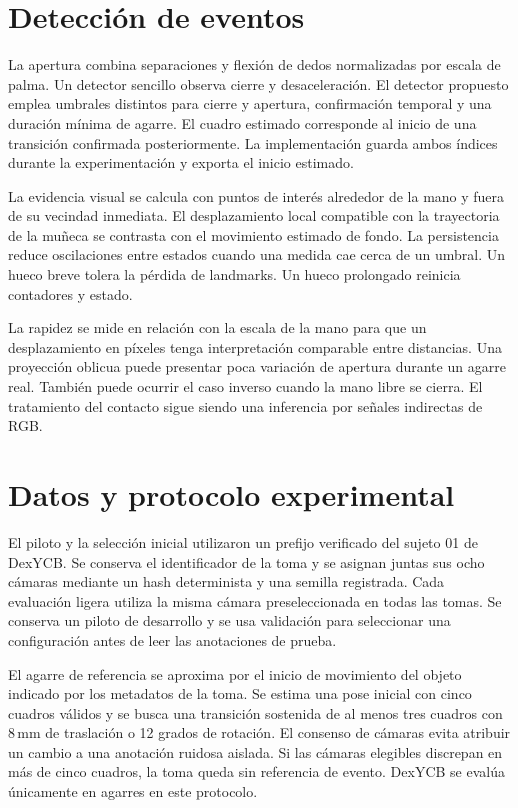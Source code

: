 \documentclass[conference]{IEEEtran}
\begin{document}
\section{Detección de eventos}
La apertura combina separaciones y flexión de dedos normalizadas por escala de palma. Un detector sencillo observa cierre y desaceleración. El detector propuesto emplea umbrales distintos para cierre y apertura, confirmación temporal y una duración mínima de agarre. El cuadro estimado corresponde al inicio de una transición confirmada posteriormente. La implementación guarda ambos índices durante la experimentación y exporta el inicio estimado.

La evidencia visual se calcula con puntos de interés alrededor de la mano y fuera de su vecindad inmediata. El desplazamiento local compatible con la trayectoria de la muñeca se contrasta con el movimiento estimado de fondo. La persistencia reduce oscilaciones entre estados cuando una medida cae cerca de un umbral. Un hueco breve tolera la pérdida de landmarks. Un hueco prolongado reinicia contadores y estado.

La rapidez se mide en relación con la escala de la mano para que un desplazamiento en píxeles tenga interpretación comparable entre distancias. Una proyección oblicua puede presentar poca variación de apertura durante un agarre real. También puede ocurrir el caso inverso cuando la mano libre se cierra. El tratamiento del contacto sigue siendo una inferencia por señales indirectas de RGB.

\section{Datos y protocolo experimental}
El piloto y la selección inicial utilizaron un prefijo verificado del sujeto 01 de DexYCB. Se conserva el identificador de la toma y se asignan juntas sus ocho cámaras mediante un hash determinista y una semilla registrada. Cada evaluación ligera utiliza la misma cámara preseleccionada en todas las tomas. Se conserva un piloto de desarrollo y se usa validación para seleccionar una configuración antes de leer las anotaciones de prueba.

El agarre de referencia se aproxima por el inicio de movimiento del objeto indicado por los metadatos de la toma. Se estima una pose inicial con cinco cuadros válidos y se busca una transición sostenida de al menos tres cuadros con 8\,mm de traslación o 12 grados de rotación. El consenso de cámaras evita atribuir un cambio a una anotación ruidosa aislada. Si las cámaras elegibles discrepan en más de cinco cuadros, la toma queda sin referencia de evento. DexYCB se evalúa únicamente en agarres en este protocolo.
\end{document}
